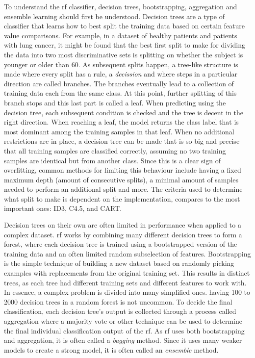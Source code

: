 To understand the \gls{rf} classifier, decision trees, bootstrapping, aggregation and ensemble learning should first be understood.
Decision trees are a type of classifier that learns how to best split the training data based on certain feature value comparisons.
For example, in a dataset of healthy patients and patients with lung cancer, it might be found that the best first split to make for dividing the data into two most discriminative sets is splitting on whether the subject is younger or older than 60. 
As subsequent splits happen, a tree-like structure is made where every split has a rule, a \textit{decission} and where steps in a particular direction are called branches.
The branches eventually lead to a collection of training data each from the same class.
At this point, further splitting of this branch stops and this last part is called a leaf.
When predicting using the decision tree, each subsequent condition is checked and the tree is decent in the right direction.
When reaching a leaf, the model returns the class label that is most dominant among the training samples in that leaf.
When no additional restrictions are in place, a decision tree can be made that is so big and precise that all training samples are classified correctly, assuming no two training samples are identical but from another class. 
Since this is a clear sign of overfitting, common methods for limiting this behaviour include having a fixed maximum depth (amount of consecutive splits), a minimal amount of samples needed to perform an additional split and more.
The criteria used to determine what split to make is dependent on the implementation, \citet{dec_trees_compared} compares to the most important ones: ID3, C4.5, and CART.

Decision trees on their own are often limited in performance when applied to a complex dataset.
\Gls{rf} works by combining many different decision trees to form a forest, where each decision tree is trained using a bootstrapped version of the training data and an often limited random subselection of features.
Bootstrapping is the simple technique of building a new dataset based on randomly picking examples with replacements from the original training set.
This results in distinct trees, as each tree had different training sets and different features to work with.
In essence, a complex problem is divided into many simplified ones.
having 100 to 2000 decision trees in a random forest is not uncommon.
To decide the final classification, each decision tree's output is collected through a process called aggregation where a majority vote or other technique can be used to determine the final individual classification output of the \gls{rf}.
As \gls{rf} uses both bootstrapping and aggregation, it is often called a \textit{bagging} method.
Since it uses many weaker models to create a strong model, it is often called an \textit{ensemble} method.




